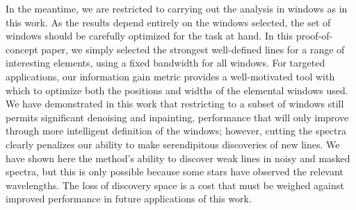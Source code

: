 \documentclass[a4paper,fleqn,usenatbib]{mnras}
\newcommand{\mkn}[1]{\textbf{\textcolor{red}{MKN: #1}}}
\begin{document}
In the meantime, we are restricted to carrying out the analysis in windows as in this work. As the results depend entirely on the windows selected, the set of windows should be carefully optimized for the task at hand. In this proof-of-concept paper, we simply selected the strongest well-defined lines for a range of interesting elements, using a fixed bandwidth for all windows. For targeted applications, our information gain metric provides a well-motivated tool with which to optimize both the positions and widths of the elemental windows used. We have demonstrated in this work that restricting to a subset of windows still permits significant denoising and inpainting, performance that will only improve through more intelligent definition of the windows; however, cutting the spectra clearly penalizes our ability to make serendipitous discoveries of new lines. We have shown here the method's ability to discover weak lines in noisy and masked spectra, but this is only possible because some stars have observed the relevant wavelengths. The loss of discovery space is a cost that must be weighed against improved performance in future applications of this work.

\end{document}

